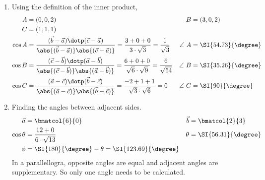 \begin{enumerate}
      \item Using the definition of the inner product,
            \begin{align}
                  A                                                                 &
                  = (0, 0, 2)                                                       &
                  B                                                                 &
                  = (3, 0, 2)                                                         \\
                  C                                                                 &
                  = (1, 1, 1)                                                         \\
                  \cos A                                                            &
                  = \frac{(\vec{b} - \vec{a}) \dotp (\vec{c} - \vec{a})}
                  {\abs{(\vec{b} - \vec{a})}\abs{(\vec{c} - \vec{a})}}
                  = \frac{3 + 0 + 0}{3 \cdot \sqrt{3}} = \frac{1}{\sqrt{3}}         &
                  \angle\ A                                                         &
                  = \SI{54.73}{\degree}                                               \\
                  \cos B                                                            &
                  = \frac{(\vec{c} - \vec{b}) \dotp (\vec{a} - \vec{b})}
                  {\abs{(\vec{c} - \vec{b})}\abs{(\vec{a} - \vec{b})}}
                  = \frac{6 + 0 + 0}{\sqrt{6} \cdot \sqrt{9}} = \frac{6}{\sqrt{54}} &
                  \angle\ B                                                         &
                  = \SI{35.26}{\degree}                                               \\
                  \cos C                                                            &
                  = \frac{(\vec{a} - \vec{c}) \dotp (\vec{b} - \vec{c})}
                  {\abs{(\vec{a} - \vec{c})}\abs{(\vec{b} - \vec{c})}}
                  = \frac{-2 + 1 + 1}{\sqrt{3} \cdot \sqrt{6}} = 0                  &
                  \angle\ C                                                         &
                  = \SI{90}{\degree}
            \end{align}

      \item Finding the angles between adjacent sides.
            \begin{align}
                  \vec{a}     & = \bmatcol{6}{0}                                    &
                  \vec{b}     & = \bmatcol{2}{3}                                      \\
                  \cos \theta & = \frac{12 + 0}{6 \cdot \sqrt{13}}                  &
                  \theta      & = \SI{56.31}{\degree}                                 \\
                  \phi        & = \SI{180}{\degree} - \theta = \SI{123.69}{\degree}
            \end{align}
            In a parallellogra, opposite angles are equal and adjacent angles are
            supplementary. So only one angle needs to be calculated.


\end{enumerate}

